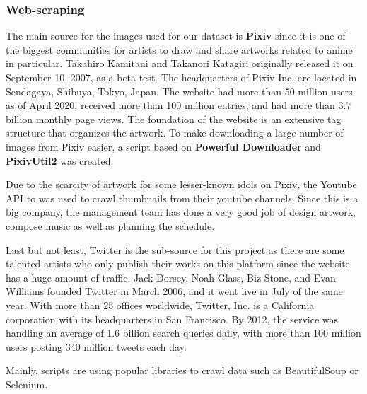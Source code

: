 \subsubsection{Web-scraping}
    The main source for the images used for our dataset is \textbf{Pixiv} since it is one of the biggest communities for artists to draw and share artworks related to anime in particular.
    Takahiro Kamitani and Takanori Katagiri originally released it on September 10, 2007, as a beta test. 
    The headquarters of Pixiv Inc. are located in Sendagaya, Shibuya, Tokyo, Japan. 
    The website had more than 50 million users as of April 2020, received more than 100 million entries, and had more than 3.7 billion monthly page views. 
    The foundation of the website is an extensive tag structure that organizes the artwork.
    To make downloading a large number of images from Pixiv easier, a script based on \textbf{Powerful Downloader}\cite{PixivBatchDownloader} and \textbf{PixivUtil2}\cite{PixivUtil2} was created.
    
    Due to the scarcity of artwork for some lesser-known idols on Pixiv, the Youtube API to was used to crawl thumbnails from their youtube channels.
    Since this is a big company, the management team has done a very good job of design artwork, compose music as well as planning the schedule. 
    
    Last but not least, Twitter is the sub-source for this project as there are some talented artists who only publish their works on this platform since the website has a huge amount of traffic.
    Jack Dorsey, Noah Glass, Biz Stone, and Evan Williams founded Twitter in March 2006, and it went live in July of the same year. 
    With more than 25 offices worldwide, Twitter, Inc. is a California corporation with its headquarters in San Francisco. 
    By 2012, the service was handling an average of 1.6 billion search queries daily, with more than 100 million users posting 340 million tweets each day\cite{Twitter}.
    
    Mainly, scripts are using popular libraries to crawl data such as BeautifulSoup or Selenium.